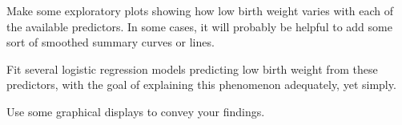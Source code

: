 \documentclass[10pt]{report}\usepackage[]{graphicx}\usepackage[]{color}
\begin{document}
\begin{Exercises}
  \begin{enumerate*}
  
    \item Make some exploratory plots showing how low birth weight varies with each of the available predictors.  In some cases, it will probably be helpful to add some sort of smoothed summary curves or lines.
    \begin{ans}
    \end{ans}
    
    \item Fit several logistic regression models predicting low birth weight from these predictors, with the goal of explaining this phenomenon adequately, yet simply.
    \begin{ans}
    \end{ans}
    
    \item Use some graphical displays to convey your findings.
    \begin{ans}
    \end{ans}
    
  \end{enumerate*}


\end{Exercises}
\end{document}

